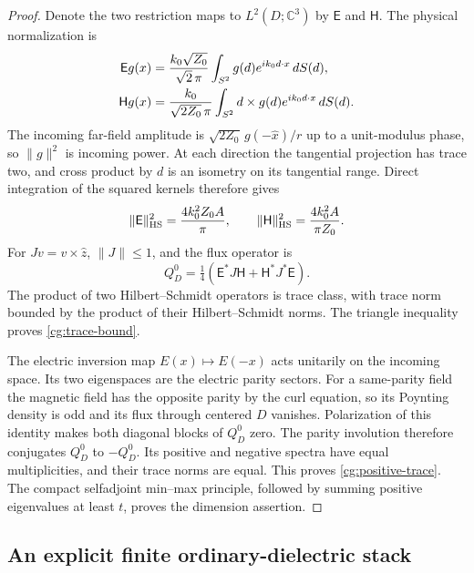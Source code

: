 \begin{proof}
Denote the two restriction maps to $L^2(D;\mathbb C^3)$ by
$\mathsf E$ and $\mathsf H$.  The physical normalization is
\begin{align}
 \mathsf E g(x)&=\frac{k_0\sqrt{Z_0}}{\sqrt2\,\pi}
                 \int_{S^2}g(d)e^{ik_0d\cdot x}\,dS(d),\notag\\
 \mathsf H g(x)&=\frac{k_0}{\sqrt{2Z_0}\,\pi}
                 \int_{S^2}d\times g(d)e^{ik_0d\cdot x}\,dS(d).
 \label{cg:herglotz}
\end{align}
The incoming far-field amplitude is
$\sqrt{2Z_0}\,g(-\widehat x)/r$ up to a unit-modulus phase, so
$\|g\|^2$ is incoming power.  At each direction the tangential
projection has trace two, and cross product by $d$ is an isometry
on its tangential range.  Direct integration of the squared kernels
therefore gives
\begin{equation}\label{cg:hilbert-schmidt}
 \|\mathsf E\|_{\rm HS}^2=\frac{4k_0^2Z_0A}{\pi},\qquad
 \|\mathsf H\|_{\rm HS}^2=\frac{4k_0^2A}{\pi Z_0}.
\end{equation}
For $Jv=v\times\widehat z$, $\|J\|\leq1$, and the flux operator is
\begin{equation}\label{cg:flux-factor}
 Q_D^0=\tfrac14
   (\mathsf E^*J\mathsf H+\mathsf H^*J^*\mathsf E).
\end{equation}
The product of two Hilbert--Schmidt operators is trace class, with
trace norm bounded by the product of their Hilbert--Schmidt norms.
The triangle inequality proves \eqref{cg:trace-bound}.

The electric inversion map $E(x)\mapsto E(-x)$ acts unitarily on
the incoming space.  Its two eigenspaces are the electric parity
sectors.  For a same-parity field the magnetic field has the opposite
parity by the curl equation, so its Poynting density is odd and its
flux through centered $D$ vanishes.  Polarization of this identity
makes both diagonal blocks of $Q_D^0$ zero.  The parity involution
therefore conjugates $Q_D^0$ to $-Q_D^0$.  Its positive and negative
spectra have equal multiplicities, and their trace norms are equal.
This proves \eqref{cg:positive-trace}.  The compact selfadjoint
min--max principle, followed by summing positive eigenvalues at least
$t$, proves the dimension assertion.
\end{proof}

\subsection{An explicit finite ordinary-dielectric stack}

